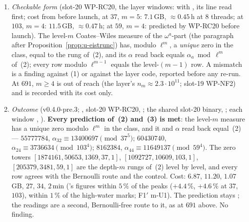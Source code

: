 \documentclass[11pt]{article}
\begin{document}
\begin{prediction}
\begin{enumerate}
  $\alpha_a\bmod\ell^{m}$; $N=m+4$ gives the same values. The script reproduces every value already in this document or in [E]: $925$, $28305$, $281570$ and the rungs $284$, $37580$, $1072544$ at $37$;
  $2266$, $458453$ and $228$, $914250$ at $103$; $143037$, $272945$, $139090008$, $279599330$ and $342252$, $342440$, $49928412$, $159113510$ at $691$; and at $59$ the depth-$2$ rung $914$ (slot-19
  R19-3) and the depth-$3$ rung $86464$ with $\alpha_{44}\equiv147913\pmod{59^{3}}$ (slot-19 WP-NF2's cell arm, Bernoulli-free). The new values are consistent with them:
  $13400697\equiv281570\pmod{37^{4}}$, $3736634\equiv458453\pmod{103^{3}}$, $11649137\equiv147913\pmod{59^{3}}$.
\item \emph{Checkable form} (slot-20 WP-RC20, the layer windows:  with , its  line read first; cost from
   before launch, at $37$, $m=5$: $7.1$\,GB, $\approx0.45$\,h at $8$ threads; at $103$, $m=4$: $11.5$\,GB, $\approx0.47$\,h; at $59$, $m=4$: predicted by WP-RC20 before launch).
  The level-$m$ Coates--Wiles measure of the $\omega^{a}$-part (the paragraph after Proposition~\ref{prop:u-eistrunc}) has, modulo $\ell^{m}$, a \emph{unique} zero in the class, equal
  to the rung of~(2), and its $\alpha$ read back equals $\alpha_a\bmod\ell^{m}$ of~(2); every row modulo $\ell^{m-1}$ equals the level-$(m-1)$ row. A mismatch is a finding against (1) or
  against the layer code, reported before any re-run. At $691$, $m\ge4$ is out of reach (the layer's $n_m\approx2.3\cdot10^{11}$; slot-19 WP-NF2) and is recorded with its cost only.
\item \emph{Outcome} (v0.4.0-pre.3; \COMP, slot-20 WP-RC20, ; the shared slot-20 binary, ; each window
  , ). \textbf{Every prediction of~(2) and~(3) is met}: the level-$m$ measure has
  a unique zero modulo $\ell^{m}$ in the class, and it and $\alpha$ read back equal~(2) --- $55777784$, $\alpha_{32}\equiv13400697\pmod{37^{5}}$; $60430740$,
  $\alpha_{24}\equiv3736634\pmod{103^{4}}$; $8162384$, $\alpha_{44}\equiv11649137\pmod{59^{4}}$. The zero towers $[1874161,50653,1369,37,1]$, $[1092727,10609,103,1]$,
  $[205379,3481,59,1]$ are the depth-$m$ rungs of~(2) level by level, and every row agrees with the Bernoulli route and the control. Cost: $6.87$, $11.20$, $1.07$\,GB, $27$, $34$, $2$\,min
  ('s figures within $5\,\%$ of the  peaks ($+4.4\,\%$, $+4.6\,\%$ at $37$, $103$), within $1\,\%$ of the high-water marks; F1$'$ m-U1). The prediction stays \PROVED; the readings are a second, Bernoulli-free route to it, as at $691$ above. No finding.
\end{enumerate}
\end{prediction}
\end{document}
